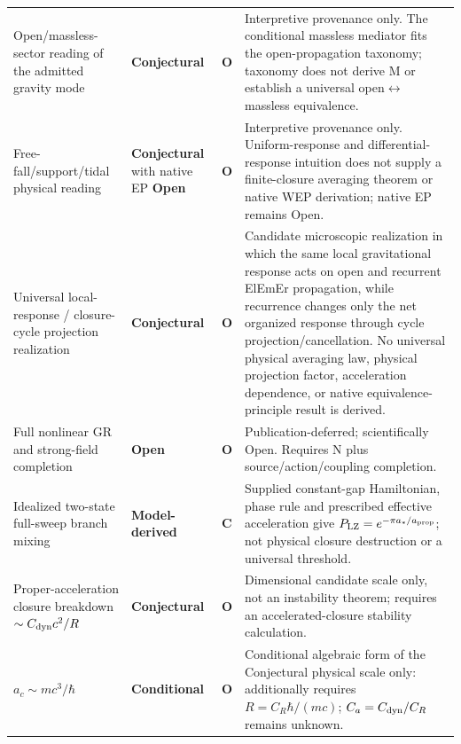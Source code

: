\documentclass[11pt]{article}
\newcommand{\statusConditional}{\textcolor{yellow!60!black}{\textbf{Conditional}}}
\newcommand{\statusOpen}{\textcolor{red!75!black}{\textbf{Open}}}
\newcommand{\statusConjectural}{\textcolor{magenta!65!black}{\textbf{Conjectural}}}
\newcommand{\statusModelDerived}{\textcolor{cyan!55!black}{\textbf{Model-derived}}}
\newcommand{\Control}{\textbf{C}}
\newcommand{\OpenBridge}{\textbf{O}}
\theoremstyle{plain}
\theoremstyle{remark}
\begin{document}
{\begin{longtable}{@{}P{3.8cm}P{2.8cm}P{1.5cm}P{5.3cm}@{}}
Open/massless-sector reading of the admitted gravity mode & \statusConjectural{} & \OpenBridge{} & Interpretive provenance only. The conditional massless mediator fits the open-propagation taxonomy; taxonomy does not derive M or establish a universal open$\leftrightarrow$massless equivalence. \\
Free-fall/support/tidal physical reading & \statusConjectural{} with native EP \statusOpen{} & \OpenBridge{} & Interpretive provenance only. Uniform-response and differential-response intuition does not supply a finite-closure averaging theorem or native WEP derivation; native EP remains Open. \\
Universal local-response / closure-cycle projection realization &
\statusConjectural{} &
\OpenBridge{} &
Candidate microscopic realization in which the same local gravitational response acts on
open and recurrent ElEmEr propagation, while recurrence changes only the net organized
response through cycle projection/cancellation.  No universal physical averaging law,
physical projection factor, acceleration dependence, or native equivalence-principle result is
derived. \\

Full nonlinear GR and strong-field completion & \statusOpen{} & \OpenBridge{} & Publication-deferred; scientifically Open. Requires N plus source/action/coupling completion. \\
Idealized two-state full-sweep branch mixing & \statusModelDerived{} & \Control{} & Supplied constant-gap Hamiltonian, phase rule and prescribed effective acceleration give $P_{\rm LZ}=e^{-\pi a_*/a_{\rm prop}}$; not physical closure destruction or a universal threshold. \\
Proper-acceleration closure breakdown $\sim C_{\rm dyn}c^2/R$ & \statusConjectural{} & \OpenBridge{} & Dimensional candidate scale only, not an instability theorem; requires an accelerated-closure stability calculation. \\
$a_c\sim mc^3/\hbar$ & \statusConditional{} & \OpenBridge{} & Conditional algebraic form of the Conjectural physical scale only: additionally requires $R=C_R\hbar/(mc)$; $C_a=C_{\rm dyn}/C_R$ remains unknown. \\
\bottomrule
\end{longtable}
}
\end{document}

